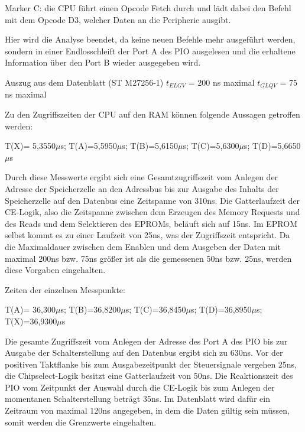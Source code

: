 Marker C: die CPU führt einen Opcode Fetch durch und lädt dabei den Befehl mit dem Opcode D3, welcher Daten an die Peripherie ausgibt.

Hier wird die Analyse beendet, da keine neuen Befehle mehr ausgeführt werden, sondern in einer Endlosschleift der Port A des PIO ausgelesen und die erhaltene Information über den Port B wieder ausgegeben wird.

Auszug aus dem Datenblatt (ST M27256-1)
$t_{ELGV}$ = 200 ns maximal
$t_{GLQV}$ = 75 ns maximal

Zu den Zugriffszeiten der CPU auf den RAM können folgende Aussagen getroffen werden:

T(X)= 5,3550$\mu$s; T(A)=5,5950$\mu$s; T(B)=5,6150$\mu$s; T(C)=5,6300$\mu$s; T(D)=5,6650$\mu$s

Durch diese Messwerte ergibt sich eine Gesamtzugriffszeit vom Anlegen der Adresse der Speicherzelle an den Adressbus bis zur Ausgabe des Inhalts der Speicherzelle auf den Datenbus eine Zeitspanne von 310ns.   Die Gatterlaufzeit der CE-Logik, also die Zeitspanne zwischen dem Erzeugen des Memory Requests und des Reads und dem Selektieren des EPROMs, beläuft sich auf 15ns. Im EPROM selbst kommt es zu einer Laufzeit von 25ns, was der Zugriffszeit entspricht. Da die Maximaldauer zwischen dem Enablen und dem Ausgeben der Daten mit maximal 200ns bzw. 75ns größer ist als die gemessenen 50ns bzw. 25ns, werden diese Vorgaben eingehalten.

Zeiten der einzelnen Messpunkte:

T(A)= 36,300$\mu$s;  T(B)=36,8200$\mu$s; T(C)=36,8450$\mu$s; T(D)=36,8950$\mu$s; T(X)=36,9300$\mu$s

Die gesamte Zugriffszeit vom Anlegen der Adresse des Port A des PIO bis zur Ausgabe der Schalterstellung auf den Datenbus ergibt sich zu 630ns. Vor der positiven Taktflanke bis zum Ausgabezeitpunkt der Steuersignale vergehen 25ns, die Chipselect-Logik besitzt eine Gatterlaufzeit von 50ns. Die Reaktionszeit des PIO vom Zeitpunkt der Auswahl durch die CE-Logik bis zum Anlegen der momentanen Schalterstellung beträgt 35ns. Im Datenblatt wird dafür ein Zeitraum von maximal 120ns angegeben, in dem die Daten gültig sein müssen, somit werden die Grenzwerte eingehalten.

